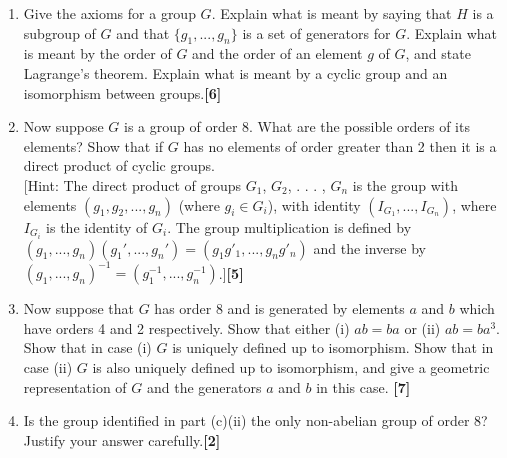 \documentclass[a4paper]{article}
\begin{document}
\begin{qns}\leavevmode
\begin{enumerate}[label=(\alph*)]
\item Give the axioms for a group $G$. Explain what is meant by saying that $H$ is a subgroup of $G$ and that $\{g_1, . . . , g_n\}$ is a set of generators for $G$. Explain what is meant by the order of $G$ and the order of an element $g$ of $G$, and state Lagrange’s theorem. Explain what is meant by a cyclic group and an isomorphism between groups.\hfill\textbf{[6]}
\item Now suppose $G$ is a group of order 8. What are the possible orders of its elements? Show that if $G$ has no elements of order greater than 2 then it is a direct product of cyclic groups.\\[5pt] [Hint: The direct product of groups $G_1$, $G_2$, . . . , $G_n$ is the group with elements $(g_1, g_2, . . . , g_n)$ (where $g_i\in G_i$), with identity $(I_{G_1} , . . . , I_{G_n})$, where $I_{G_i}$ is the identity of $G_i$. The group multiplication is defined by $(g_1, . . . , g_n)(g_1', . . . , g_n') = (g_1g'_1, . . . , g_ng'_n)$ and the inverse by $(g_1, . . . , g_n)^{−1} = (g^{−1}_1 , . . . , g^{−1}_n )$.]\hfill\textbf{[5]}
\item Now suppose that $G$ has order 8 and is generated by elements $a$ and $b$ which have orders 4 and 2 respectively. Show that either (i) $ab = ba$ or (ii) $ab = ba^3$. Show that in case (i) $G$ is uniquely defined up to isomorphism. Show that in case (ii) $G$ is also uniquely defined up to isomorphism, and give a geometric representation of $G$ and the generators $a$ and $b$ in this case. \hfill\textbf{[7]}
\item Is the group identified in part (c)(ii) the only non-abelian group of order 8? Justify your answer carefully.\hfill\textbf{[2]}
\end{enumerate}
\end{qns}
\end{document}
